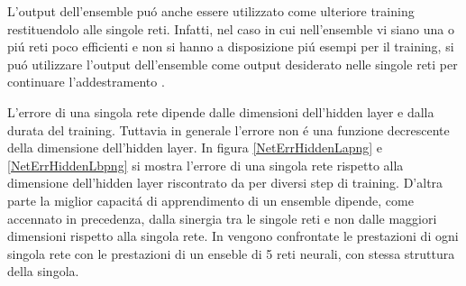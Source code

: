 \documentclass[a4paper,12pt]{report}
\begin{document}
 L'output dell'ensemble pu\'o anche essere utilizzato come ulteriore training restituendolo alle singole reti. 
 Infatti, nel caso in cui nell'ensemble vi siano una o pi\'u reti poco efficienti e non si hanno a disposizione pi\'u esempi per il training, si pu\'o utilizzare l'output dell'ensemble come output desiderato nelle singole reti per continuare l'addestramento \cite{lincoln1990synergy}. 
 
 L'errore di una singola rete dipende dalle dimensioni dell'hidden layer e dalla durata del training. 
 Tuttavia in generale l'errore non \'e una funzione decrescente della dimensione dell'hidden layer. 
 In figura \ref{NetErrHiddenLapng} e \ref{NetErrHiddenLbpng} si mostra l'errore di una singola rete rispetto alla dimensione dell'hidden layer riscontrato da \cite{lincoln1990synergy} per diversi step di training. 
 D'altra parte la miglior capacit\'a di apprendimento di un ensemble dipende, come accennato in precedenza, dalla sinergia tra le singole reti e non dalle maggiori dimensioni rispetto alla singola rete. 
 In \cite{lincoln1990synergy} vengono confrontate le prestazioni di ogni singola rete con le prestazioni di un enseble di 5 reti neurali, con stessa struttura della singola.
 
\end{document}
